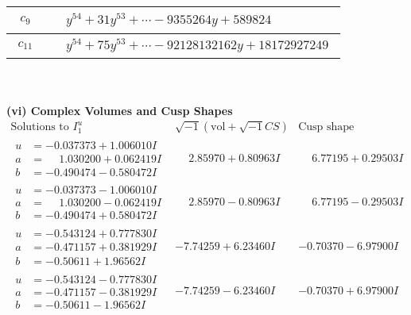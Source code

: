 \documentclass[1p]{elsarticle_modified}
\theoremstyle{definition}
\newcommand{\I}{\sqrt{-1}}
\begin{document}
\begin{tabular}{m{50pt}|m{274pt}}
\hline $$\begin{aligned}c_{9}\end{aligned}$$&$\begin{aligned}
&y^{54}+31 y^{53}+\cdots-9355264 y+589824
\end{aligned}$\\
\hline $$\begin{aligned}c_{11}\end{aligned}$$&$\begin{aligned}
&y^{54}+75 y^{53}+\cdots-92128132162 y+18172927249
\end{aligned}$\\
\hline
\end{tabular}\\~\\
\newpage\flushleft \textbf{(vi) Complex Volumes and Cusp Shapes}
$$\begin{array}{c|c|c}  
\text{Solutions to }I^u_{1}& \I (\text{vol} + \sqrt{-1}CS) & \text{Cusp shape}\\
 \hline 
\begin{aligned}
u &= -0.037373 + 1.006010 I \\
a &= \phantom{-}1.030200 + 0.062419 I \\
b &= -0.490474 - 0.580472 I\end{aligned}
 & \phantom{-}2.85970 + 0.80963 I & \phantom{-}6.77195 + 0.29503 I \\ \hline\begin{aligned}
u &= -0.037373 - 1.006010 I \\
a &= \phantom{-}1.030200 - 0.062419 I \\
b &= -0.490474 + 0.580472 I\end{aligned}
 & \phantom{-}2.85970 - 0.80963 I & \phantom{-}6.77195 - 0.29503 I \\ \hline\begin{aligned}
u &= -0.543124 + 0.777830 I \\
a &= -0.471157 + 0.381929 I \\
b &= -0.50611 + 1.96562 I\end{aligned}
 & -7.74259 + 6.23460 I & -0.70370 - 6.97900 I \\ \hline\begin{aligned}
u &= -0.543124 - 0.777830 I \\
a &= -0.471157 - 0.381929 I \\
b &= -0.50611 - 1.96562 I\end{aligned}
 & -7.74259 - 6.23460 I & -0.70370 + 6.97900 I \\ \hline\begin{aligned}

\end{aligned}
\end{array}$$
\end{document}
